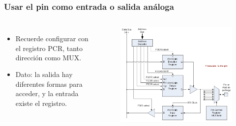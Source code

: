 \documentclass[10.5pt,scale=1.0,t,aspectratio=169,hyperref={pdfpagelabels=false}]{beamer}
\begin{document}
\begin{frame}
	\frametitle{Usar el pin como entrada o salida análoga}
	{\small
		\begin{columns}
			\begin{itemize}
				\item Recuerde configurar con el registro PCR, tanto dirección como MUX.
				\item Dato: la salida hay diferentes formas para acceder, y la entrada existe el registro. 
			\end{itemize}
			
			\begin{figure}
				\centering\includegraphics[scale=0.35]{fig_PCR}
			\end{figure}
			
		\end{columns}
	}	
\end{frame}
\end{document}
